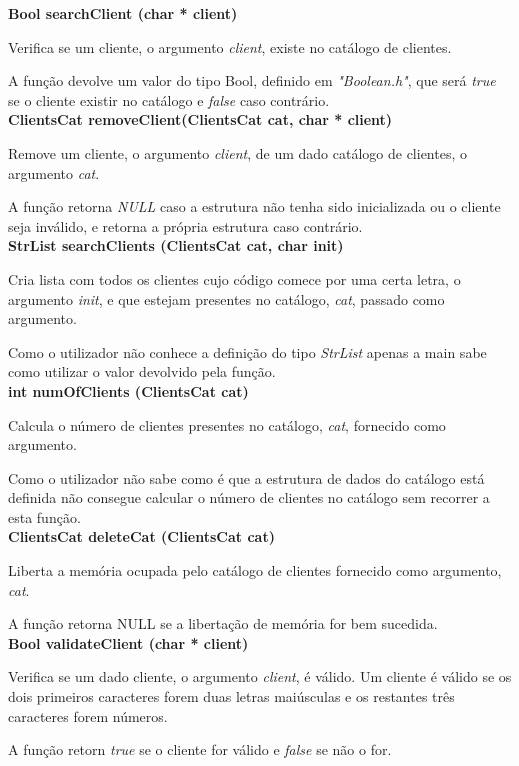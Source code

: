 \documentclass[10pt] {article}
\begin{document}
\noindent \textbf {Bool searchClient (char * client)}
\par Verifica se um cliente, o argumento \emph{client}, existe no catálogo de clientes.
\par A função devolve um valor do tipo Bool, definido em \emph{"Boolean.h"}, que será \emph{true} se o
cliente existir no catálogo e \emph{false} caso contrário. \\

\noindent \textbf{ClientsCat removeClient(ClientsCat cat, char * client)}
\par Remove um cliente, o argumento \emph{client}, de um dado catálogo de clientes, o argumento \emph{cat}.
\par A função retorna \emph{NULL} caso a estrutura não tenha sido inicializada ou o cliente seja inválido, e
retorna a própria estrutura caso contrário. \\

\noindent \textbf{StrList searchClients (ClientsCat cat, char init)}
\par Cria lista com todos os clientes cujo código comece por uma certa letra, o argumento \emph{init}, e que
estejam presentes no catálogo, \emph{cat}, passado como argumento.
\par Como o utilizador não conhece a definição do tipo \emph{StrList} apenas a main sabe como utilizar
o valor devolvido pela função. \\

\noindent \textbf{int numOfClients (ClientsCat cat)}
\par Calcula o número de clientes presentes no catálogo, \emph{cat}, fornecido como argumento.
\par Como o utilizador não sabe como é que a estrutura de dados do catálogo está definida não consegue
calcular o número de clientes no catálogo sem recorrer a esta função. \\

\noindent \textbf{ClientsCat deleteCat (ClientsCat cat)}
\par Liberta a memória ocupada pelo catálogo de clientes fornecido como argumento, \emph{cat}.
\par A função retorna NULL se a libertação de memória for bem sucedida. \\

\noindent \textbf{Bool validateClient (char * client)}
\par Verifica se um dado cliente, o argumento \emph{client}, é válido. Um cliente é válido se os dois primeiros
caracteres forem duas letras maiúsculas e os restantes três caracteres forem números.
\par A função retorn \emph{true} se o cliente for válido e \emph{false} se não o for.
\end{document}

